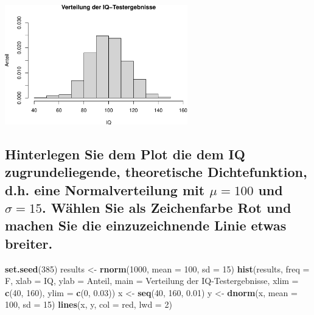 \documentclass[12pt,a4paper]{article}
\newenvironment{Shaded}{\begin{snugshade}}{\end{snugshade}}
\newcommand{\AttributeTok}[1]{\textcolor[rgb]{0.13,0.29,0.53}{#1}}
\newcommand{\DecValTok}[1]{\textcolor[rgb]{0.00,0.00,0.81}{#1}}
\newcommand{\FloatTok}[1]{\textcolor[rgb]{0.00,0.00,0.81}{#1}}
\newcommand{\FunctionTok}[1]{\textcolor[rgb]{0.13,0.29,0.53}{\textbf{#1}}}
\newcommand{\NormalTok}[1]{#1}
\newcommand{\OtherTok}[1]{\textcolor[rgb]{0.56,0.35,0.01}{#1}}
\newcommand{\StringTok}[1]{\textcolor[rgb]{0.31,0.60,0.02}{#1}}
\begin{document}
\begin{center}\includegraphics[width=300px]{solution_3_files/figure-latex/unnamed-chunk-12-1} \end{center}

\subsection{\texorpdfstring{Hinterlegen Sie dem Plot die dem IQ
zugrundeliegende, theoretische Dichtefunktion, d.h. eine
Normalverteilung mit \(\mu=100\) und \(\sigma=15\). Wählen Sie als
Zeichenfarbe Rot und machen Sie die einzuzeichnende Linie etwas
breiter.}{Hinterlegen Sie dem Plot die dem IQ zugrundeliegende, theoretische Dichtefunktion, d.h. eine Normalverteilung mit \textbackslash mu=100 und \textbackslash sigma=15. Wählen Sie als Zeichenfarbe Rot und machen Sie die einzuzeichnende Linie etwas breiter.}}\label{hinterlegen-sie-dem-plot-die-dem-iq-zugrundeliegende-theoretische-dichtefunktion-d.h.-eine-normalverteilung-mit-mu100-und-sigma15.-wuxe4hlen-sie-als-zeichenfarbe-rot-und-machen-sie-die-einzuzeichnende-linie-etwas-breiter.}

\begin{Shaded}
\begin{Highlighting}[]
    \FunctionTok{set.seed}\NormalTok{(}\DecValTok{385}\NormalTok{)}
\NormalTok{    results }\OtherTok{\textless{}{-}} \FunctionTok{rnorm}\NormalTok{(}\DecValTok{1000}\NormalTok{, }\AttributeTok{mean =} \DecValTok{100}\NormalTok{, }\AttributeTok{sd =} \DecValTok{15}\NormalTok{)}
    \FunctionTok{hist}\NormalTok{(results, }\AttributeTok{freq =}\NormalTok{ F, }\AttributeTok{xlab =} \StringTok{\textquotesingle{}IQ\textquotesingle{}}\NormalTok{, }\AttributeTok{ylab =} \StringTok{\textquotesingle{}Anteil\textquotesingle{}}\NormalTok{, }
         \AttributeTok{main =} \StringTok{\textquotesingle{}Verteilung der IQ{-}Testergebnisse\textquotesingle{}}\NormalTok{,}
         \AttributeTok{xlim =} \FunctionTok{c}\NormalTok{(}\DecValTok{40}\NormalTok{, }\DecValTok{160}\NormalTok{), }\AttributeTok{ylim =} \FunctionTok{c}\NormalTok{(}\DecValTok{0}\NormalTok{, }\FloatTok{0.03}\NormalTok{))}
\NormalTok{    x }\OtherTok{\textless{}{-}} \FunctionTok{seq}\NormalTok{(}\DecValTok{40}\NormalTok{, }\DecValTok{160}\NormalTok{, }\FloatTok{0.01}\NormalTok{)}
\NormalTok{    y }\OtherTok{\textless{}{-}} \FunctionTok{dnorm}\NormalTok{(x, }\AttributeTok{mean =} \DecValTok{100}\NormalTok{, }\AttributeTok{sd =} \DecValTok{15}\NormalTok{)}
    \FunctionTok{lines}\NormalTok{(x, y, }\AttributeTok{col =} \StringTok{\textquotesingle{}red\textquotesingle{}}\NormalTok{, }\AttributeTok{lwd =} \DecValTok{2}\NormalTok{)}
\end{Highlighting}
\end{Shaded}
\end{document}
